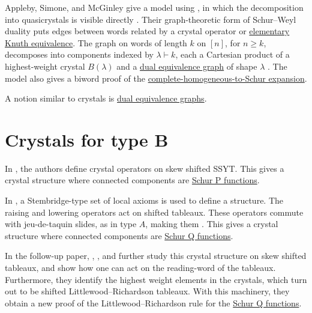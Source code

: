Appleby, Simone, and McGinley give a model using
, in which the decomposition into quasicrystals
is visible directly \cite{ApplebySimoneMcGinley2026x}.
Their graph-theoretic form of Schur--Weyl duality puts edges between words
related by a crystal operator or
\hyperref[knuthRelations]{elementary Knuth equivalence}.
The graph on words of length $k$ on $[n]$, for $n\geq k$,
decomposes into components indexed by $\lambda\vdash k$,
each a Cartesian product of a highest-weight crystal $B(\lambda)$ and
a \hyperref[schurPositivityDualEquivalence]{dual equivalence graph}
of shape $\lambda$
\cite[Thm.~6.6--6.7]{ApplebySimoneMcGinley2026x}.
The model also gives a biword proof of the
\hyperref[kostkaCoefficients]{complete-homogeneous-to-Schur expansion}.




A notion similar to crystals is
\hyperref[schurPositivityDualEquivalence]{dual equivalence graphs}.




\section[crystalsTypeB]{Crystals for type B}

In \cite{GillespieHawkesPohSchilling2020,AssafOguz2018,AssafOguz2020},
the authors define crystal operators on skew shifted SSYT.
This gives a crystal structure where connected components are 
\hyperref[schurP]{Schur P functions}.



In \cite{GillespieLevinson2019}, a Stembridge-type set of local axioms is used
to define a \label{typeBCrystal} structure.
The raising and lowering operators act on shifted tableaux.
These operators commute with jeu-de-taquin slides, as in type $A$, making them
.
This gives a crystal structure where connected components are 
\hyperref[schurQ]{Schur Q functions}.

In the follow-up paper, , , and
 \cite{GillespieLevinsonPurbhoo2020}
further study this crystal structure on skew shifted tableaux,
and show how one can act on the reading-word of the tableaux.
Furthermore, they identify the highest weight elements in the crystals, which turn out to
be shifted Littlewood--Richardson tableaux.
With this machinery, they obtain a new proof of the Littlewood--Richardson rule for the 
\hyperref[schurQ]{Schur Q functions}.

